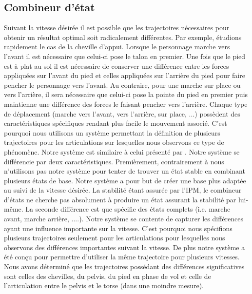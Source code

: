 \documentclass[runningheads,a4paper]{llncs}
\begin{document}
\subsection{Combineur d'état}
\label{sec:multi_state}
%
Suivant la vitesse désirée il est possible que les trajectoires nécessaires pour obtenir un résultat optimal soit radicalement différentes. Par exemple, étudions rapidement le cas de la cheville d'appui. Lorsque le personnage marche vers l'avant il est nécessaire que celui-ci pose le talon en premier. Une fois que le pied est à plat au sol il est nécessaire de conserver une différence entre les forces appliquées sur l'avant du pied et celles appliquées sur l'arrière du pied pour faire pencher le personnage vers l'avant. Au contraire, pour une marche sur place ou vers l'arrière, il sera nécessaire que celui-ci pose la pointe du pied en premier puis maintienne une différence des forces le faisant pencher vers l'arrière. Chaque type de déplacement (marche vers l'avant, vers l'arrière, sur place, ...) possèdent des caractéristiques spécifiques rendant plus facile le mouvement associé. C'est pourquoi nous utilisons un système permettant la définition de plusieurs trajectoires pour les articulations sur lesquelles nous observons ce type de phénomène. Notre système est similaire à celui présenté par \cite{coros2009robust}. Notre système se différencie par deux caractéristiques. Premièrement, contrairement à \cite{coros2009robust} nous n'utilisons pas notre système pour tenter de trouver un état stable en combinant plusieurs états de base. Notre système a pour but de créer une base plus adaptée au suivi de la vitesse désirée. La stabilité étant assurée par l'IPM, le combineur d'états ne cherche pas absolument à produire un état assurant la stabilité par lui-même. La seconde différence est que \cite{coros2009robust} spécifie des états complets (i.e. marche avant, marche arrière, ....). Notre système se contente de capturer les différences ayant une influence importante sur la vitesse. C'est pourquoi nous spécifions plusieurs trajectoires seulement pour les articulations pour lesquelles nous observons des différences importantes suivant la vitesse. De plus notre système a été conçu pour permettre d'utiliser la même trajectoire pour plusieurs vitesses. Nous avons déterminé que les trajectoires possédant des différences significatives sont celles des chevilles, du pelvis, du pied en phase de vol et celle de l'articulation entre le pelvis et le torse (dans une moindre mesure). 
\end{document}
